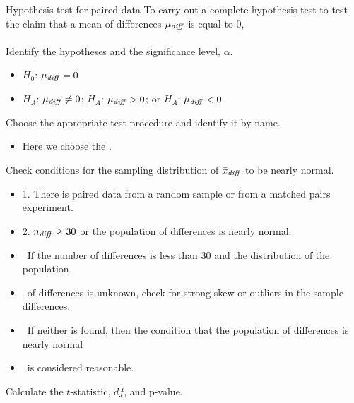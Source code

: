 






\begin{onebox}{Hypothesis test for paired data}
To carry out a complete hypothesis test to test the claim that a mean of differences $\mu_{\text{\emph{diff}}}$ is equal to 0,
\\
\\
 Identify the hypotheses and the significance level, $\alpha$.\vspace{-1mm}
\begin{itemize}
\setlength{\itemsep}{0mm}
\item[] $H_0$: $\mu_{\text{\emph{diff}}} = 0$  
\item[]  $H_A$: $\mu_{\text{\emph{diff}}} \ne 0$;  \quad $H_A$: $\mu_{\text{\emph{diff}}} > 0$; \quad or \quad $H_A$: $\mu_{\text{\emph{diff}}} < 0$ 
\end{itemize} 
 Choose the appropriate test procedure and identify it by name.  \vspace{-1mm}
\begin{itemize}
\item[] Here we choose the .
\end{itemize}
  Check conditions for the sampling distribution of $\bar{x}_{\text{\emph{diff}}}$ to be nearly normal.\vspace{-1mm}
\begin{itemize}
\setlength{\itemsep}{0mm}
\item[] 1. There is paired data from a random sample or from a matched pairs experiment.
\item[] 2. $n_{\text{\emph{diff}}}\ge 30$ or the population of differences is nearly normal.
 \item[] \quad \  If the number of differences is less than 30 and the distribution of the population 
 \item[] \quad \ of differences is unknown, check for strong skew or outliers in the sample differences.
\item[] \quad \ If neither is found, then the condition that the population of differences is nearly normal 
\item[] \quad \ is considered reasonable.  
\end{itemize}
   Calculate the $t$-statistic, $df$, and p-value.
\begin{itemize}

\end{itemize}
\end{onebox}
